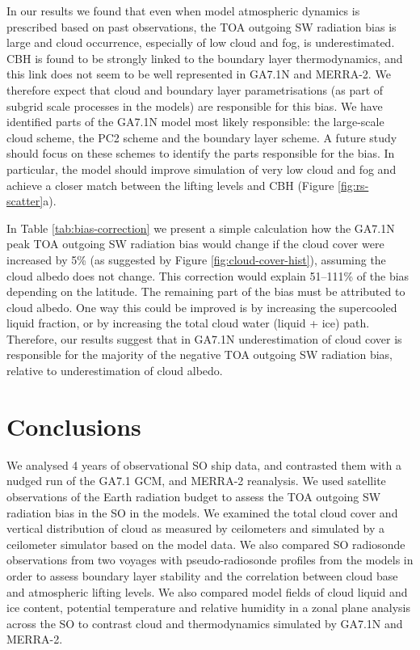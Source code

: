 In our results we found that even when model atmospheric dynamics is prescribed
based on past observations, the TOA outgoing SW radiation bias is large and
cloud occurrence, especially of low cloud and fog, is underestimated. CBH is
found to be strongly linked to the boundary layer thermodynamics, and this link
does not seem to be well represented in GA7.1N and MERRA-2. We therefore expect
that cloud and boundary layer parametrisations (as part of subgrid scale
processes in the models) are responsible for this bias. We have identified
parts of the GA7.1N model most likely responsible: the large-scale cloud scheme,
the PC2 scheme \citep{wilson2008a,wilson2008b} and the boundary layer scheme. A
future study should focus on these schemes to identify the parts responsible
for the bias. In particular, the model should improve simulation of very low
cloud and fog and achieve a closer match between the lifting levels and CBH
(Figure \ref{fig:rs-scatter}a).

In Table \ref{tab:bias-correction} we present a simple calculation how the
GA7.1N peak TOA outgoing SW radiation bias would change if the cloud cover were
increased by 5\% (as suggested by Figure \ref{fig:cloud-cover-hist}), assuming
the cloud albedo does not change. This correction would explain 51--111\% of
the bias depending on the latitude. The remaining part of the bias must be
attributed to cloud albedo. One way this could be improved is by increasing the
supercooled liquid fraction, or by increasing the total cloud water (liquid +
ice) path. Therefore, our results suggest that in GA7.1N underestimation of
cloud cover is responsible for the majority of the negative TOA outgoing SW
radiation bias, relative to underestimation of cloud albedo.

\section{Conclusions}

We analysed 4 years of observational SO ship data, and contrasted them with a
nudged run of the GA7.1 GCM, and MERRA-2 reanalysis. We used satellite
observations of the Earth radiation budget to assess the TOA outgoing SW
radiation bias in the SO in the models. We examined the total cloud cover and
vertical distribution of cloud as measured by ceilometers and simulated by a
ceilometer simulator based on the model data. We also compared SO radiosonde
observations from two voyages with pseudo-radiosonde profiles from the models in
order to assess boundary layer stability and the correlation between cloud base
and atmospheric lifting levels. We also compared model fields of cloud liquid
and ice content, potential temperature and relative humidity in a zonal plane
analysis across the SO to contrast cloud and thermodynamics simulated
by GA7.1N and MERRA-2.

